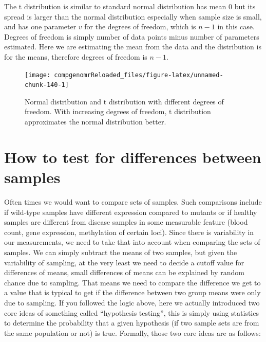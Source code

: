 \documentclass[12pt,]{krantz}
\theoremstyle{definition}
\theoremstyle{definition}
\theoremstyle{definition}
\theoremstyle{remark}
\begin{document}
The t distribution is similar to standard normal distribution has mean 0
but its spread is larger than the normal distribution especially when
sample size is small, and has one parameter \(v\) for the degrees of
freedom, which is \(n-1\) in this case. Degrees of freedom is simply
number of data points minus number of parameters estimated. Here we are
estimating the mean from the data and the distribution is for the means,
therefore degrees of freedom is \(n-1\).

\begin{figure}

{\centering \texttt{[image: compgenomrReloaded\_files/figure-latex/unnamed-chunk-140-1]} 

}

\caption{Normal distribution and t distribution with different degrees of freedom. With increasing degrees of freedom, t distribution approximates the normal distribution better.}\label{fig:unnamed-chunk-140}
\end{figure}

\hypertarget{how-to-test-for-differences-between-samples}{%
\section{How to test for differences between
samples}\label{how-to-test-for-differences-between-samples}}

Often times we would want to compare sets of samples. Such comparisons
include if wild-type samples have different expression compared to
mutants or if healthy samples are different from disease samples in some
measurable feature (blood count, gene expression, methylation of certain
loci). Since there is variability in our measurements, we need to take
that into account when comparing the sets of samples. We can simply
subtract the means of two samples, but given the variability of
sampling, at the very least we need to decide a cutoff value for
differences of means, small differences of means can be explained by
random chance due to sampling. That means we need to compare the
difference we get to a value that is typical to get if the difference
between two group means were only due to sampling. If you followed the
logic above, here we actually introduced two core ideas of something
called ``hypothesis testing'', this is simply using statistics to
determine the probability that a given hypothesis (if two sample sets
are from the same population or not) is true. Formally, those two core
ideas are as follows:
\end{document}
